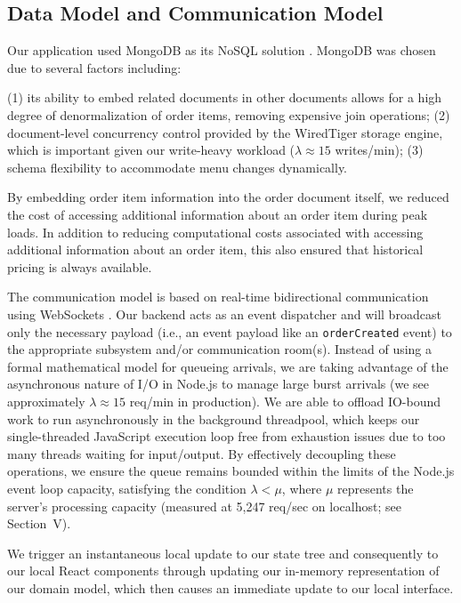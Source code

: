 \documentclass[conference]{IEEEtran}
\begin{document}
\subsection{Data Model and Communication Model}

Our application used MongoDB as its NoSQL solution \cite{lakshmi2021comparative}. MongoDB was chosen due to several factors including:

(1) its ability to embed related documents in other documents allows for a high degree of denormalization of order items, removing expensive join operations;
(2) document-level concurrency control provided by the WiredTiger storage engine, which is important given our write-heavy workload ($\lambda \approx 15$ writes/min);
(3) schema flexibility to accommodate menu changes dynamically.

By embedding order item information into the order document itself, we reduced the cost of accessing additional information about an order item during peak loads. In addition to reducing computational costs associated with accessing additional information about an order item, this also ensured that historical pricing is always available.

The communication model is based on real-time bidirectional communication using WebSockets \cite{trnka2021communication}. Our backend acts as an event dispatcher and will broadcast only the necessary payload (i.e., an event payload like an \texttt{orderCreated} event) to the appropriate subsystem and/or communication room(s). Instead of using a formal mathematical model for queueing arrivals, we are taking advantage of the asynchronous nature of I/O in Node.js to manage large burst arrivals (we see approximately $\lambda \approx 15$ req/min in production). We are able to offload IO-bound work to run asynchronously in the background threadpool, which keeps our single-threaded JavaScript execution loop free from exhaustion issues due to too many threads waiting for input/output. By effectively decoupling these operations, we ensure the queue remains bounded within the limits of the Node.js event loop capacity, satisfying the condition $\lambda < \mu$, where $\mu$ represents the server's processing capacity (measured at 5,247 req/sec on localhost; see Section~V).

We trigger an instantaneous local update to our state tree and consequently to our local React components through updating our in-memory representation of our domain model, which then causes an immediate update to our local interface.
\end{document}
